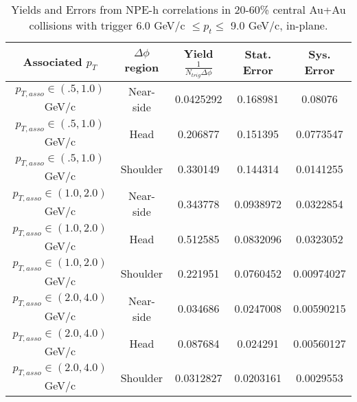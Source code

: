\begin{table}
\centering
\begin{tabular}{|c|c|c|c|c|}
\hline
Associated $p_T$    & $\Delta\phi$ region & Yield $\frac{1}{N_{trig} \Delta\phi}$ & Stat. Error & Sys. Error\\
\hline
$p_{T,asso} \in(.5, 1.0)$ GeV/c  & Near-side & 0.0425292 & 0.168981 & 0.08076 \\
\hline
$p_{T,asso} \in(.5, 1.0)$ GeV/c  & Head & 0.206877 & 0.151395 & 0.0773547 \\
\hline
$p_{T,asso} \in(.5, 1.0)$ GeV/c  & Shoulder & 0.330149 & 0.144314 & 0.0141255 \\
\hline
$p_{T,asso} \in(1.0, 2.0)$ GeV/c  & Near-side & 0.343778 & 0.0938972 & 0.0322854 \\
\hline
$p_{T,asso} \in(1.0, 2.0)$ GeV/c  & Head & 0.512585 & 0.0832096 & 0.0323052 \\
\hline
$p_{T,asso} \in(1.0, 2.0)$ GeV/c  & Shoulder & 0.221951 & 0.0760452 & 0.00974027 \\
\hline
$p_{T,asso} \in(2.0, 4.0)$ GeV/c  & Near-side & 0.034686 & 0.0247008 & 0.00590215 \\
\hline
$p_{T,asso} \in(2.0, 4.0)$ GeV/c  & Head & 0.087684 & 0.024291 & 0.00560127 \\
\hline
$p_{T,asso} \in(2.0, 4.0)$ GeV/c  & Shoulder & 0.0312827 & 0.0203161 & 0.0029553 \\
\hline
\end{tabular}
\caption[Yields and Errors in Au+Au Correlations, In-Plane, 20-60\%, High Trigger]{Yields and Errors from NPE-h correlations in 20-60\% central Au+Au collisions with trigger 6.0 GeV/c $\leq p_t \leq$ 9.0 GeV/c, in-plane.}
\label{tab:InPlaneLow}
\end{table}

